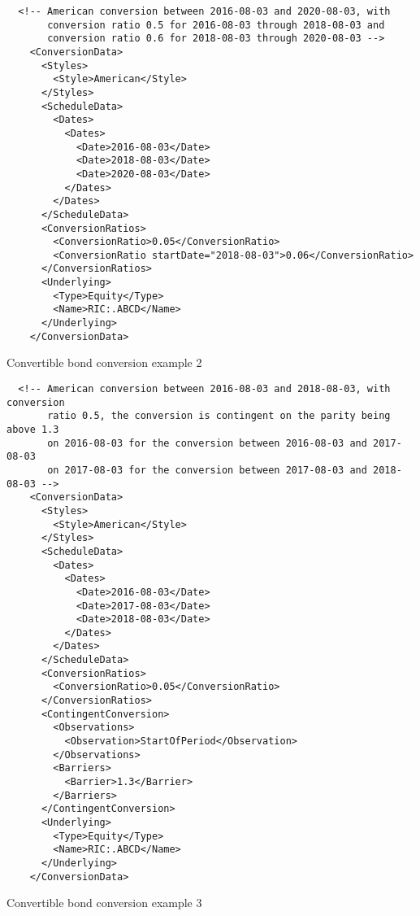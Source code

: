 \begin{listing}[H]
\begin{verbatim}
  <!-- American conversion between 2016-08-03 and 2020-08-03, with
       conversion ratio 0.5 for 2016-08-03 through 2018-08-03 and
       conversion ratio 0.6 for 2018-08-03 through 2020-08-03 -->
    <ConversionData>
      <Styles>
        <Style>American</Style>
      </Styles>
      <ScheduleData>
        <Dates>
          <Dates>
            <Date>2016-08-03</Date>
            <Date>2018-08-03</Date>
            <Date>2020-08-03</Date>
          </Dates>
        </Dates>
      </ScheduleData>
      <ConversionRatios>
        <ConversionRatio>0.05</ConversionRatio>
        <ConversionRatio startDate="2018-08-03">0.06</ConversionRatio>
      </ConversionRatios>
      <Underlying>
        <Type>Equity</Type>
        <Name>RIC:.ABCD</Name>
      </Underlying>
    </ConversionData>
\end{verbatim}
\caption{Convertible bond conversion example 2}
\label{lst:convertiblebonddata_conversion_2}
\end{listing}

\begin{listing}[H]
\begin{verbatim}
  <!-- American conversion between 2016-08-03 and 2018-08-03, with conversion
       ratio 0.5, the conversion is contingent on the parity being above 1.3
       on 2016-08-03 for the conversion between 2016-08-03 and 2017-08-03
       on 2017-08-03 for the conversion between 2017-08-03 and 2018-08-03 -->
    <ConversionData>
      <Styles>
        <Style>American</Style>
      </Styles>
      <ScheduleData>
        <Dates>
          <Dates>
            <Date>2016-08-03</Date>
            <Date>2017-08-03</Date>
            <Date>2018-08-03</Date>
          </Dates>
        </Dates>
      </ScheduleData>
      <ConversionRatios>
        <ConversionRatio>0.05</ConversionRatio>
      </ConversionRatios>
      <ContingentConversion>
        <Observations>
          <Observation>StartOfPeriod</Observation>
        </Observations>
        <Barriers>
          <Barrier>1.3</Barrier>
        </Barriers>
      </ContingentConversion>
      <Underlying>
        <Type>Equity</Type>
        <Name>RIC:.ABCD</Name>
      </Underlying>
    </ConversionData>
\end{verbatim}
\caption{Convertible bond conversion example 3}
\label{lst:convertiblebonddata_conversion_3}
\end{listing}


